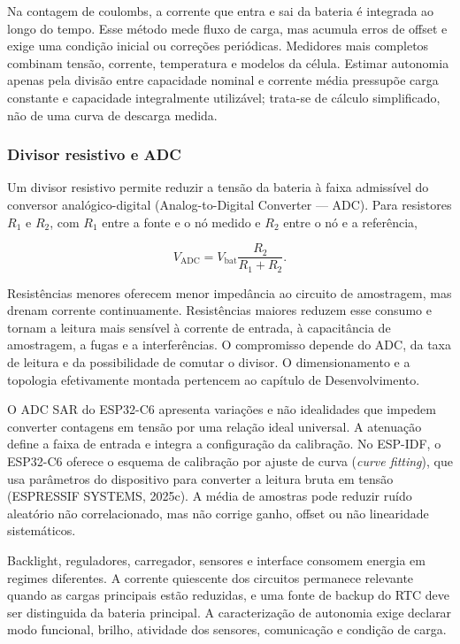 \documentclass{article}
\begin{document}
Na contagem de coulombs, a corrente que entra e sai da bateria \'e integrada ao longo do tempo. Esse m\'etodo mede fluxo de carga, mas acumula erros de offset e exige uma condi\c{c}\~ao inicial ou corre\c{c}\~oes peri\'odicas. Medidores mais completos combinam tens\~ao, corrente, temperatura e modelos da c\'elula. Estimar autonomia apenas pela divis\~ao entre capacidade nominal e corrente m\'edia pressup\~oe carga constante e capacidade integralmente utiliz\'avel; trata-se de c\'alculo simplificado, n\~ao de uma curva de descarga medida.


\subsubsection{Divisor resistivo e ADC}


Um divisor resistivo permite reduzir a tens\~ao da bateria \`a faixa admiss\'ivel do conversor anal\'ogico-digital (Analog-to-Digital Converter --- ADC). Para resistores \(R_1\) e \(R_2\), com \(R_1\) entre a fonte e o n\'o medido e \(R_2\) entre o n\'o e a refer\^encia,


\[
V_{\mathrm{ADC}}=V_{\mathrm{bat}}\frac{R_2}{R_1+R_2}.
\]


Resist\^encias menores oferecem menor imped\^ancia ao circuito de amostragem, mas drenam corrente continuamente. Resist\^encias maiores reduzem esse consumo e tornam a leitura mais sens\'ivel \`a corrente de entrada, \`a capacit\^ancia de amostragem, a fugas e a interfer\^encias. O compromisso depende do ADC, da taxa de leitura e da possibilidade de comutar o divisor. O dimensionamento e a topologia efetivamente montada pertencem ao cap\'itulo de Desenvolvimento.


O ADC SAR do ESP32-C6 apresenta varia\c{c}\~oes e n\~ao idealidades que impedem converter contagens em tens\~ao por uma rela\c{c}\~ao ideal universal. A atenua\c{c}\~ao define a faixa de entrada e integra a configura\c{c}\~ao da calibra\c{c}\~ao. No ESP-IDF, o ESP32-C6 oferece o esquema de calibra\c{c}\~ao por ajuste de curva (\emph{curve fitting}), que usa par\^ametros do dispositivo para converter a leitura bruta em tens\~ao (ESPRESSIF SYSTEMS, 2025c). A m\'edia de amostras pode reduzir ru\'ido aleat\'orio n\~ao correlacionado, mas n\~ao corrige ganho, offset ou n\~ao linearidade sistem\'aticos.


Backlight, reguladores, carregador, sensores e interface consomem energia em regimes diferentes. A corrente quiescente dos circuitos permanece relevante quando as cargas principais est\~ao reduzidas, e uma fonte de backup do RTC deve ser distinguida da bateria principal. A caracteriza\c{c}\~ao de autonomia exige declarar modo funcional, brilho, atividade dos sensores, comunica\c{c}\~ao e condi\c{c}\~ao de carga.
\end{document}

